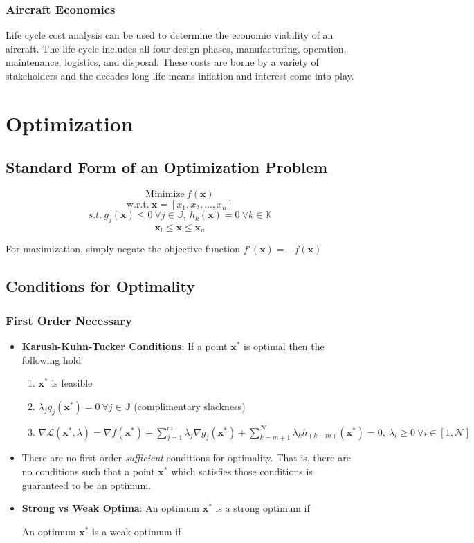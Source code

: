 \documentclass[11pt]{article}
\newcommand{\Item}[1]{\item \textbf{#1}:}
\newcommand{\CenteredBoxed}[1]{\begin{center}\boxed{#1}\end{center}}
\newcommand{\sumlim}[2]{\sum\limits_{#1}^{#2}}
\newcommand{\boldx}{\mathbf{x}}
\newcommand{\xstar}{\boldx^*}
\begin{document}
\subsubsection{Aircraft Economics}
Life cycle cost analysis can be used to determine the economic viability of an aircraft. The life cycle includes all four design phases, manufacturing, operation, maintenance, logistics, and disposal. These costs are borne by a variety of stakeholders and the decades-long life means inflation and interest come into play.


\section{Optimization}
\subsection{Standard Form of an Optimization Problem}
$$\mathrm{Minimize}\ f(\boldx)$$
$$\mathrm{w.r.t.}\ \boldx=[x_1,x_2,\dots,x_n]$$
$$s.t.\ g_j(\boldx)\leq0\ \forall j\in\mathbb{J},\ h_k(\boldx)=0\ \forall k\in\mathbb{K}$$
$$\boldx_l\leq\boldx\leq\boldx_u$$

For maximization, simply negate the objective function $f'(\boldx)=-f(\boldx)$

\subsection{Conditions for Optimality}
\subsubsection{First Order Necessary}
\begin{itemize}
\Item{Karush-Kuhn-Tucker Conditions} If a point $\xstar$ is optimal then the following hold
	\begin{enumerate}
	\item $\xstar$ is feasible
	\item $\lambda_jg_j(\xstar)=0\ \forall j\in\mathbb{J}$ (complimentary slackness)
	\item $\nabla\mathcal{L}(\xstar,\lambda)=\nabla f(\xstar)+\sumlim{j=1}{m}\lambda_j\nabla g_j(\xstar)+\sumlim{k=m+1}{\mathcal{N}}\lambda_kh_{(k-m)}(\xstar)=0,\ \lambda_i\geq0\ \forall i\in[1,\mathcal{N}]$
	\end{enumerate}
\item There are no first order \emph{sufficient} conditions for optimality. That is, there are no conditions such that a point $\xstar$ which satisfies those conditions is guaranteed to be an optimum.
\Item{Strong vs Weak Optima} An optimum $\xstar$ is a strong optimum if
\CenteredBoxed{\xstar<\boldx\ \forall \boldx\in[\xstar-\varepsilon,\xstar+\varepsilon]}
An optimum $\xstar$ is a weak optimum if
\CenteredBoxed{\xstar\leq \boldx\ \forall \boldx\in[\xstar-\varepsilon,\xstar+\varepsilon]}
\end{itemize}
\end{document}
